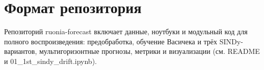\documentclass[14pt]{extarticle}
\begin{document}
\section*{Формат репозитория}
Репозиторий {ruonia-forecast} включает данные, ноутбуки и модульный код для полного воспроизведения: предобработка, обучение Васичека и трёх SINDy-вариантов, мультигоризонтные прогнозы, метрики и визуализации (см. README и {01\_1st\_sindy\_drift.ipynb}).

\begingroup
\setlength\bibitemsep{0.5pt}
\renewcommand*{\bibfont}{\tiny}
\printbibliography
\endgroup
\end{document}
